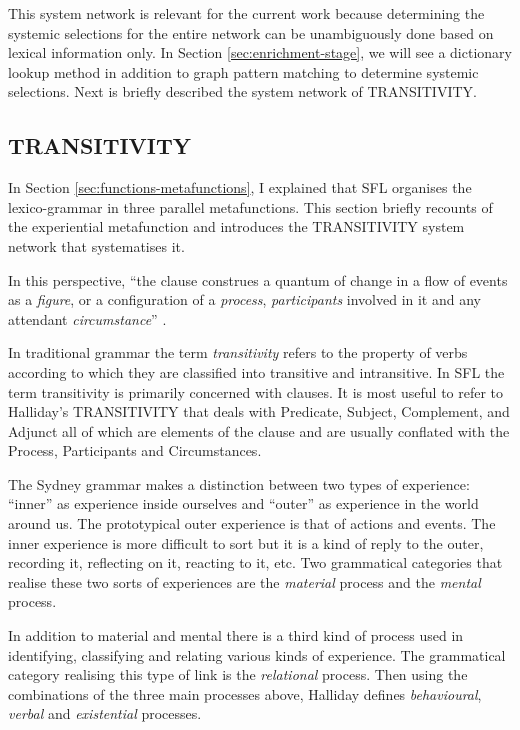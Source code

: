     This system network is relevant for the current work because determining the systemic selections for the entire network can be unambiguously done based on lexical information only. In Section \ref{sec:enrichment-stage}, we will see a dictionary lookup method in addition to graph pattern matching to determine systemic selections. Next is briefly described the system network of TRANSITIVITY. 
      
\subsection{TRANSITIVITY}
\label{sec:transitivity}
    In Section \ref{sec:functions-metafunctions}, I explained that SFL organises the lexico-grammar in three parallel metafunctions. This section briefly recounts of the experiential metafunction and introduces the TRANSITIVITY system network that systematises it.
    
    In this perspective, ``the clause construes a quantum of change in a flow of events as a \textit{figure}, or a configuration of a \textit{process}, \textit{participants} involved in it and any attendant \textit{circumstance}'' \citep[212]{Halliday2013}. 
    
    In traditional grammar the term \textit{transitivity} refers to the property of verbs according to which they are classified into transitive and intransitive. In SFL the term transitivity is primarily concerned with clauses. It is most useful to refer to Halliday's TRANSITIVITY \citep{Halliday67-parts1+2,Halliday68-part3,Halliday68} that deals with Predicate, Subject, Complement, and Adjunct all of which are elements of the clause and are usually conflated with the Process, Participants and Circumstances. 

    The Sydney grammar makes a distinction between two types of experience: ``inner'' as experience inside ourselves and ``outer'' as experience in the world around us. The prototypical outer experience is that of actions and events. The inner experience is more difficult to sort but it is a kind of reply to the outer, recording it, reflecting on it, reacting to it, etc. Two grammatical categories that realise these two sorts of experiences are the \textit{material} process and the \textit{mental} process.
    
    In addition to material and mental there is a third kind of process used in identifying, classifying and relating various kinds of experience. The grammatical category realising this type of link is the \textit{relational} process. Then using the combinations of the three main processes above, Halliday defines \textit{behavioural}, \textit{verbal} and \textit{existential} processes. 

